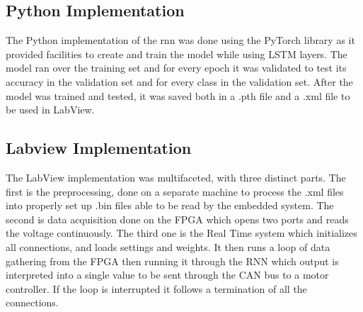 \subsection{Python Implementation}
The Python implementation of the \acrshort{rnn} was done using the PyTorch library as it provided facilities 
to create and train the model while using LSTM layers. The model ran over the training set and for every epoch
it was validated to test its accuracy in the validation set and for every class in the validation set. After the model was trained 
and tested, it was saved both in a .pth file and a .xml file to be used in LabView.

\subsection{Labview Implementation}
The LabView implementation was multifaceted, with three distinct parts. The first is the preprocessing, done on a separate machine to process the .xml files into properly set up .bin files able
to be read by the embedded system. The second is data acquisition done on the \acrfull{FPGA} which opens two ports and reads the voltage continuously. The third one is the Real Time system which
initializes all connections, and loads settings and weights. It then runs a loop of data gathering from the \acrshort{FPGA} then running it through the RNN which output is interpreted into a single 
value to be sent through the CAN bus to a motor controller. If the loop is interrupted it follows a termination of all the connections.